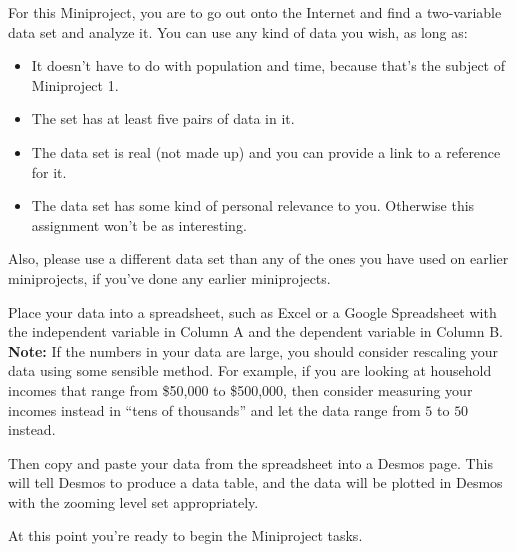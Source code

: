 \documentclass[11pt,letterpaper]{article}
\begin{document}
For this Miniproject, you are to go out onto the Internet and find a two-variable data set and analyze it. You can use any kind of data you wish, as long as: 
	\begin{itemize}
		\item It doesn't have to do with population and time, because that's the subject of Miniproject 1. 
		\item The set has at least five pairs of data in it. 
		\item The data set is real (not made up) and you can provide a link to a reference for it. 
		\item The data set has some kind of personal relevance to you. Otherwise this assignment won't be as interesting.  
	\end{itemize}
Also, please use a different data set than any of the ones you have used on earlier miniprojects, if you've done any earlier miniprojects. 

Place your data into a spreadsheet, such as Excel or a Google Spreadsheet with the independent variable in Column A and the dependent variable in Column B. \textbf{Note:} If the numbers in your data are large, you should consider rescaling your data using some sensible method. For example, if you are looking at household incomes that range from \$50,000 to \$500,000, then consider measuring your incomes instead in ``tens of thousands'' and let the data range from $5$ to $50$ instead. 

Then copy and paste your data from the spreadsheet into a Desmos page. This will tell Desmos to produce a data table, and the data will be plotted in Desmos with the zooming level set appropriately. 

At this point you're ready to begin the Miniproject tasks. 
\end{document}
